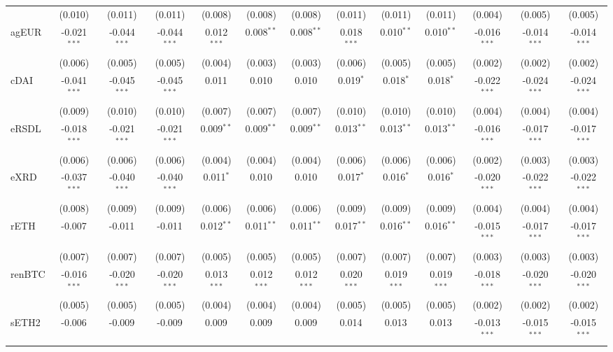 \begin{table}[!htbp]
\begin{tabular}{@{\extracolsep{5pt}}lcccccccccccc}
  & (0.010) & (0.011) & (0.011) & (0.008) & (0.008) & (0.008) & (0.011) & (0.011) & (0.011) & (0.004) & (0.005) & (0.005) \\
 agEUR & -0.021$^{***}$ & -0.044$^{***}$ & -0.044$^{***}$ & 0.012$^{***}$ & 0.008$^{**}$ & 0.008$^{**}$ & 0.018$^{***}$ & 0.010$^{**}$ & 0.010$^{**}$ & -0.016$^{***}$ & -0.014$^{***}$ & -0.014$^{***}$ \\
  & (0.006) & (0.005) & (0.005) & (0.004) & (0.003) & (0.003) & (0.006) & (0.005) & (0.005) & (0.002) & (0.002) & (0.002) \\
 cDAI & -0.041$^{***}$ & -0.045$^{***}$ & -0.045$^{***}$ & 0.011$^{}$ & 0.010$^{}$ & 0.010$^{}$ & 0.019$^{*}$ & 0.018$^{*}$ & 0.018$^{*}$ & -0.022$^{***}$ & -0.024$^{***}$ & -0.024$^{***}$ \\
  & (0.009) & (0.010) & (0.010) & (0.007) & (0.007) & (0.007) & (0.010) & (0.010) & (0.010) & (0.004) & (0.004) & (0.004) \\
 eRSDL & -0.018$^{***}$ & -0.021$^{***}$ & -0.021$^{***}$ & 0.009$^{**}$ & 0.009$^{**}$ & 0.009$^{**}$ & 0.013$^{**}$ & 0.013$^{**}$ & 0.013$^{**}$ & -0.016$^{***}$ & -0.017$^{***}$ & -0.017$^{***}$ \\
  & (0.006) & (0.006) & (0.006) & (0.004) & (0.004) & (0.004) & (0.006) & (0.006) & (0.006) & (0.002) & (0.003) & (0.003) \\
 eXRD & -0.037$^{***}$ & -0.040$^{***}$ & -0.040$^{***}$ & 0.011$^{*}$ & 0.010$^{}$ & 0.010$^{}$ & 0.017$^{*}$ & 0.016$^{*}$ & 0.016$^{*}$ & -0.020$^{***}$ & -0.022$^{***}$ & -0.022$^{***}$ \\
  & (0.008) & (0.009) & (0.009) & (0.006) & (0.006) & (0.006) & (0.009) & (0.009) & (0.009) & (0.004) & (0.004) & (0.004) \\
 rETH & -0.007$^{}$ & -0.011$^{}$ & -0.011$^{}$ & 0.012$^{**}$ & 0.011$^{**}$ & 0.011$^{**}$ & 0.017$^{**}$ & 0.016$^{**}$ & 0.016$^{**}$ & -0.015$^{***}$ & -0.017$^{***}$ & -0.017$^{***}$ \\
  & (0.007) & (0.007) & (0.007) & (0.005) & (0.005) & (0.005) & (0.007) & (0.007) & (0.007) & (0.003) & (0.003) & (0.003) \\
 renBTC & -0.016$^{***}$ & -0.020$^{***}$ & -0.020$^{***}$ & 0.013$^{***}$ & 0.012$^{***}$ & 0.012$^{***}$ & 0.020$^{***}$ & 0.019$^{***}$ & 0.019$^{***}$ & -0.018$^{***}$ & -0.020$^{***}$ & -0.020$^{***}$ \\
  & (0.005) & (0.005) & (0.005) & (0.004) & (0.004) & (0.004) & (0.005) & (0.005) & (0.005) & (0.002) & (0.002) & (0.002) \\
 sETH2 & -0.006$^{}$ & -0.009$^{}$ & -0.009$^{}$ & 0.009$^{}$ & 0.009$^{}$ & 0.009$^{}$ & 0.014$^{}$ & 0.013$^{}$ & 0.013$^{}$ & -0.013$^{***}$ & -0.015$^{***}$ & -0.015$^{***}$ \\

\end{tabular}
\end{table}
